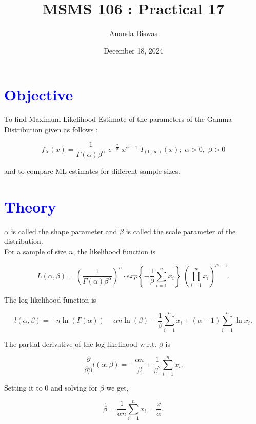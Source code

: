 \documentclass[11pt, a4paper]{article}\usepackage[]{graphicx}\usepackage[]{xcolor}
\title{MSMS 106 : Practical 17}
\author{Ananda Biswas}
\date{December 18, 2024}
\begin{document}
\maketitle


\section*{\faArrowAltCircleRight[regular] \textcolor{blue}{Objective}}

\hspace{1cm} To find Maximum Likelihood Estimate of the parameters of the Gamma Distribution given as follows :

$$f_X (x) = \dfrac{1}{\Gamma(\alpha) \beta^\alpha} \,\, e^{-\frac{x}{\beta}} \,\, x^{\alpha - 1} \,\, I_{(0, \infty)}(x); \,\, \alpha > 0, \,\, \beta > 0 $$

and to compare ML estimates for different sample sizes. 



\section*{\faArrowAltCircleRight[regular] \textcolor{blue}{Theory}}

$\alpha$ is called the shape parameter and $\beta$ is called the scale parameter of the distribution. \\

For a sample of size $n$, the likelihood function is 

$$L(\alpha, \beta) = \left( \dfrac{1}{\Gamma(\alpha) \beta^\alpha} \right)^{n} \cdot exp \left\{-\dfrac{1}{\beta}\sum \limits_{i = 1}^{n} x_i \right\} \,\, \left( \prod \limits_{i = 1}^{n} x_i \right)^{\alpha - 1}. $$


The log-likelihood function is 

$$ l(\alpha, \beta) = -n \ln(\Gamma(\alpha)) - \alpha n \ln(\beta) - \dfrac{1}{\beta}\sum \limits_{i = 1}^{n} x_i + ({\alpha - 1}) \sum \limits_{i = 1}^{n} \ln x_i .$$

The partial derivative of the log-likelihood w.r.t. $\beta$ is

$$ \dfrac{\partial}{\partial \beta} l(\alpha, \beta) = - \dfrac{\alpha n}{\beta} + \dfrac{1}{\beta^2}\sum \limits_{i = 1}^{n} x_i . $$

Setting it to $0$ and solving for $\beta$ we get,

\begin{equation}
\hat{\beta} =  \dfrac{1}{\alpha n}\sum \limits_{i = 1}^{n} x_i = \dfrac{\bar{x}}{\alpha}.
\end{equation}
\end{document}
